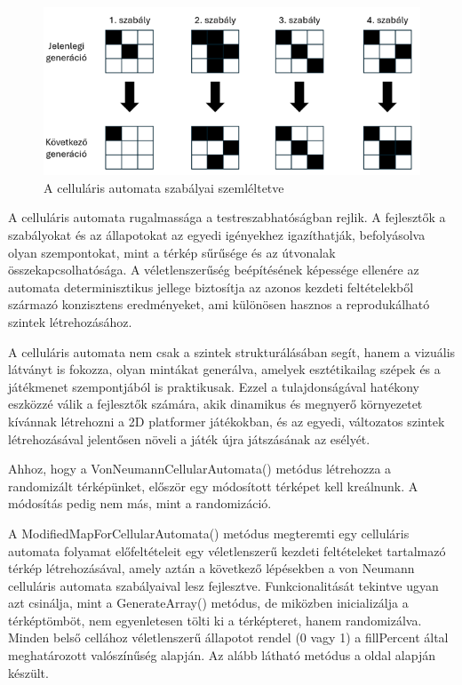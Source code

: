 \begin{figure}[ht]
\centering
\includegraphics[width = \textwidth]{images/cellularprincipals.png}
\caption{A celluláris automata szabályai szemléltetve}
\label{fig:cellularprincipals}
\end{figure}

\newpage
A celluláris automata rugalmassága a testreszabhatóságban rejlik. A fejlesztők a szabályokat és az állapotokat az egyedi igényekhez igazíthatják, befolyásolva olyan szempontokat, mint a térkép sűrűsége és az útvonalak összekapcsolhatósága. A véletlenszerűség beépítésének képessége ellenére az automata determinisztikus jellege biztosítja az azonos kezdeti feltételekből származó konzisztens eredményeket, ami különösen hasznos a reprodukálható szintek létrehozásához.\cite{cellular}

A celluláris automata nem csak a szintek strukturálásában segít, hanem a vizuális látványt is fokozza, olyan mintákat generálva, amelyek esztétikailag szépek és a játékmenet szempontjából is praktikusak. Ezzel a tulajdonságával hatékony eszközzé válik a fejlesztők számára, akik dinamikus és megnyerő környezetet kívánnak létrehozni a 2D platformer játékokban, és az egyedi, változatos szintek létrehozásával jelentősen növeli a játék újra játszásának az esélyét.\cite{cellular}


Ahhoz, hogy a VonNeumannCellularAutomata() metódus létrehozza a randomizált térképünket, először egy módosított térképet kell kreálnunk. A módosítás pedig nem más, mint a randomizáció.

A ModifiedMapForCellularAutomata() metódus megteremti egy celluláris automata folyamat előfeltételeit egy véletlenszerű kezdeti feltételeket tartalmazó térkép létrehozásával, amely aztán a következő lépésekben a von Neumann celluláris automata szabályaival lesz fejlesztve. Funkcionalitását tekintve ugyan azt csinálja, mint a GenerateArray() metódus, de miközben inicializálja a térképtömböt, nem egyenletesen tölti ki a térképteret, hanem randomizálva. Minden belső cellához véletlenszerű állapotot rendel (0 vagy 1) a fillPercent által meghatározott valószínűség alapján. Az alább látható metódus a \cite{mapgenerator} oldal alapján készült.

